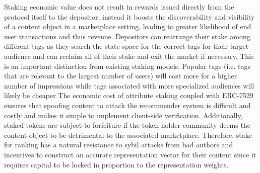 Staking economic value does not result in rewards issued directly from the protocol itself to the depositor, instead it boosts the discoverability and visibility of a content object in a marketplace setting, leading to greater likelihood of end user transactions and thus revenue. Depositors can rearrange their stake among different tags as they search the state space for the correct tags for their target audience and can reclaim all of their stake and exit the market if necessary. This is an important distinction from existing staking models. 
Popular tags (i.e. tags that are relevant to the largest number of users) will cost more for a higher number of impressions while tags associated with more specialized audiences will likely be cheaper
The economic cost of attribute staking coupled with ERC-7529 ensures that spoofing content to attack the recommender system is difficult and costly and makes it simple to implement client-side verification. Additionally, staked tokens are subject to forfeiture if the token holder community deems the content object to be detrimental to the associated marketplace. Therefore, stake for ranking has a natural resistance to sybil attacks from bad authors and incentives to construct an accurate representation vector for their content since it requires capital to be locked in proportion to the representation weights. 
